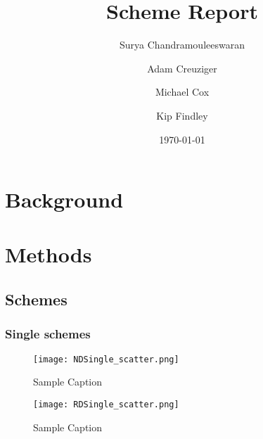 \documentclass{article}
\begin{document}
\title{Scheme Report} %
\date{\today}
\author[1, 2]{Surya Chandramouleeswaran}
\author[3]{Adam Creuziger}
\author[2]{Michael Cox}
\author[2]{Kip Findley}


\maketitle

\section{Background}


\section{Methods}






\subsection{Schemes}

\subsubsection{Single schemes}
\begin{figure}[ht]
    \centering
    \texttt{[image: NDSingle\_scatter.png]}
    \caption{Sample Caption}
\end{figure}

\begin{figure}[ht]
    \centering
    \texttt{[image: RDSingle\_scatter.png]}
    \caption{Sample Caption}
\end{figure}
\end{document}
